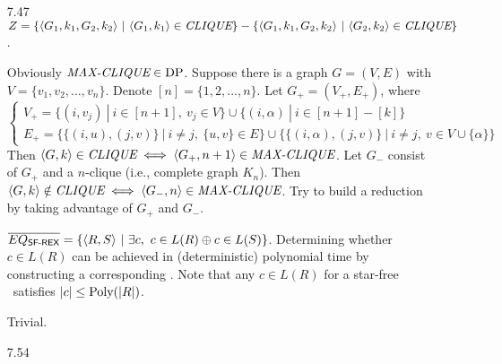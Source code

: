 \begin{itemize}
	\item[7.47]
	$Z = \{ \Bra{G_1, k_1, G_2, k_2} \ | \ \Bra{G_1, k_1} \in \IT{CLIQUE} \} - \{ \Bra{G_1, k_1, G_2, k_2} \ | \ \Bra{G_2, k_2} \in \IT{CLIQUE} \} $.
	
	\item[\Star 7.48]
	Obviously $\IT{MAX-CLIQUE} \in \RM{DP}$. Suppose there is a graph $G = (V, E)$ with $V = \{v_1, v_2, \dots, v_n \}$. Denote $[n] = \{1, 2, \dots, n\}$. Let $G_+ = (V_+, E_+)$, where
	$$
		\left\{
			\begin{array}{l}
				\displaystyle
				V_+ = \{ (i, v_j) \ | \ i \in [n + 1],\ v_j \in V \} \cup \{ (i, \alpha) \ | \ i \in [n+1] - [k] \} \\
				E_+ = \{ \{ (i, u), (j, v) \} \ | \ i \neq j,\ \{u, v\} \in E \} \cup \{ \{ (i, \alpha), (j, v) \} \ | \ i \neq j,\ v \in V \cup \{\alpha\} \}
			\end{array}
		\right.
	$$
	Then $\Bra{G, k} \in \IT{CLIQUE} \iff \Bra{G_+, n+1} \in \IT{MAX-CLIQUE}$. Let $G_-$ consist of $G_+$ and a $n$-clique (i.e., complete graph $K_n$). Then $\Bra{G, k} \notin \IT{CLIQUE} \iff \Bra{G_-, n} \in \IT{MAX-CLIQUE}$. Try to build a reduction by taking advantage of $G_+$ and $G_-$.
	
	\item[\Star 7.49]
	\Empty
	
	\item[\Star 7.50] 
	$\overline{EQ_{\textsf{SF-REX}}} = \{ \Bra{R, S} \ | \ \exists c,\ c \in L(R) \oplus c \in L(S) \}$. Determining whether $c \in L(R)$ can be achieved in (deterministic) polynomial time by constructing a corresponding \NFA . Note that any $c \in L(R)$ for a star-free \REX\ satisfies $|c| \leq \RM{Poly}(|R|)$.
	
	\item[\Star 7.51] 
	Trivial.
	
	\item[\Star 7.52]
	\Empty
	
	\item[\Star 7.53]
	\Empty
	
	\item[7.54]
	\Empty
	
\end{itemize}
